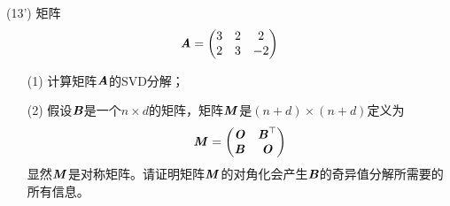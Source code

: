 \documentclass[12pt,a4paper,openany,twoside]{ctexbook}
\begin{document}
\begin{exercise}(13')
	矩阵\[ \MA = \begin{pmatrix}
		3&2&2\\
		2&3&-2
	\end{pmatrix}
 \]
 \begin{itemize}
 	\item [(1)] 计算矩阵$ \MA $的SVD分解；
 	\item [(2)] 假设$\MB$是一个$n \times d$的矩阵，矩阵$\MM$是$(n+d) \times (n+d)$定义为
 	$$\MM=\begin{pmatrix}
 		\MO& \MB^\top\\
 		\MB& \MO\end{pmatrix}$$
 	显然$\MM$是对称矩阵。请证明矩阵$\MM$的对角化会产生$\MB$的奇异值分解所需要的所有信息。
 \end{itemize}
\end{exercise}
\end{document}

